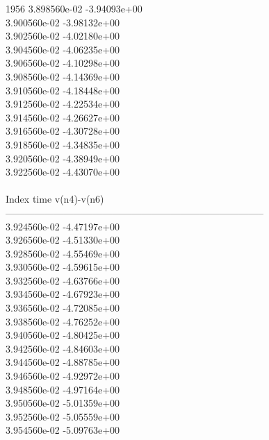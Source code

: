 1956	3.898560e-02	-3.94093e+00	\\ 	3.900560e-02	-3.98132e+00	\\ 	3.902560e-02	-4.02180e+00	\\ 	3.904560e-02	-4.06235e+00	\\ 	3.906560e-02	-4.10298e+00	\\ 	3.908560e-02	-4.14369e+00	\\ 	3.910560e-02	-4.18448e+00	\\ 	3.912560e-02	-4.22534e+00	\\ 	3.914560e-02	-4.26627e+00	\\ 	3.916560e-02	-4.30728e+00	\\ 	3.918560e-02	-4.34835e+00	\\ 	3.920560e-02	-4.38949e+00	\\ 	3.922560e-02	-4.43070e+00	\\ \hline
\\ \hline
Index   time            v(n4)-v(n6)     \\ \hline
--------------------------------------------------------------------------------\\ 	3.924560e-02	-4.47197e+00	\\ 	3.926560e-02	-4.51330e+00	\\ 	3.928560e-02	-4.55469e+00	\\ 	3.930560e-02	-4.59615e+00	\\ 	3.932560e-02	-4.63766e+00	\\ 	3.934560e-02	-4.67923e+00	\\ 	3.936560e-02	-4.72085e+00	\\ 	3.938560e-02	-4.76252e+00	\\ 	3.940560e-02	-4.80425e+00	\\ 	3.942560e-02	-4.84603e+00	\\ 	3.944560e-02	-4.88785e+00	\\ 	3.946560e-02	-4.92972e+00	\\ 	3.948560e-02	-4.97164e+00	\\ 	3.950560e-02	-5.01359e+00	\\ 	3.952560e-02	-5.05559e+00	\\ 	3.954560e-02	-5.09763e+00	\\ \hline

